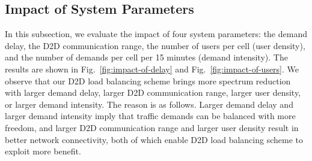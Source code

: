 





%

\subsection{Impact of System Parameters}
In this subsection, we evaluate the impact of four system parameters:
the demand delay, the D2D communication range, the number of users per cell (user density),
and the number of demands per cell per 15 minutes (demand intensity).
The results are shown in Fig.~\ref{fig:impact-of-delay} and Fig.~\ref{fig:impact-of-users}.
We observe that our D2D load balancing scheme brings more spectrum reduction
with larger demand delay, larger D2D communication range,
larger user density, or larger demand intensity.
The reason is as follows. Larger demand delay and larger demand intensity imply that traffic demands
can be balanced with more freedom, and larger D2D communication range and larger user density result in
better network connectivity, both of which enable D2D load balancing scheme to exploit more benefit.

